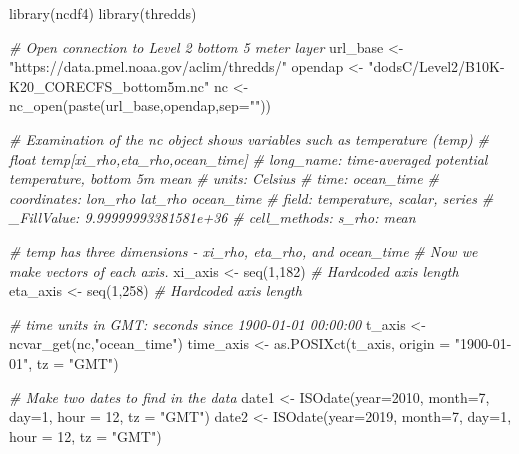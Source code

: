 \documentclass[
]{article}
\newenvironment{Shaded}{\begin{snugshade}}{\end{snugshade}}
\newcommand{\AttributeTok}[1]{\textcolor[rgb]{0.77,0.63,0.00}{#1}}
\newcommand{\CommentTok}[1]{\textcolor[rgb]{0.56,0.35,0.01}{\textit{#1}}}
\newcommand{\DecValTok}[1]{\textcolor[rgb]{0.00,0.00,0.81}{#1}}
\newcommand{\FunctionTok}[1]{\textcolor[rgb]{0.00,0.00,0.00}{#1}}
\newcommand{\NormalTok}[1]{#1}
\newcommand{\OtherTok}[1]{\textcolor[rgb]{0.56,0.35,0.01}{#1}}
\newcommand{\StringTok}[1]{\textcolor[rgb]{0.31,0.60,0.02}{#1}}
\begin{document}
\begin{Shaded}
\begin{Highlighting}[]
   \FunctionTok{library}\NormalTok{(ncdf4)}
   \FunctionTok{library}\NormalTok{(thredds)  }

   \CommentTok{\# Open connection to Level 2 bottom 5 meter layer}
\NormalTok{   url\_base }\OtherTok{\textless{}{-}} \StringTok{"https://data.pmel.noaa.gov/aclim/thredds/"}
\NormalTok{   opendap  }\OtherTok{\textless{}{-}} \StringTok{"dodsC/Level2/B10K{-}K20\_CORECFS\_bottom5m.nc"}
\NormalTok{   nc       }\OtherTok{\textless{}{-}} \FunctionTok{nc\_open}\NormalTok{(}\FunctionTok{paste}\NormalTok{(url\_base,opendap,}\AttributeTok{sep=}\StringTok{""}\NormalTok{))}

   \CommentTok{\# Examination of the nc object shows variables such as temperature (temp)}
   \CommentTok{\#        float temp[xi\_rho,eta\_rho,ocean\_time]   }
   \CommentTok{\#            long\_name: time{-}averaged potential temperature, bottom 5m mean}
   \CommentTok{\#            units: Celsius}
   \CommentTok{\#            time: ocean\_time}
   \CommentTok{\#            coordinates: lon\_rho lat\_rho ocean\_time}
   \CommentTok{\#            field: temperature, scalar, series}
   \CommentTok{\#            \_FillValue: 9.99999993381581e+36}
   \CommentTok{\#            cell\_methods: s\_rho: mean}

   \CommentTok{\# temp has three dimensions {-} xi\_rho, eta\_rho, and ocean\_time}
   \CommentTok{\# Now we make vectors of each axis.}
\NormalTok{   xi\_axis  }\OtherTok{\textless{}{-}} \FunctionTok{seq}\NormalTok{(}\DecValTok{1}\NormalTok{,}\DecValTok{182}\NormalTok{) }\CommentTok{\# Hardcoded axis length}
\NormalTok{   eta\_axis }\OtherTok{\textless{}{-}} \FunctionTok{seq}\NormalTok{(}\DecValTok{1}\NormalTok{,}\DecValTok{258}\NormalTok{) }\CommentTok{\# Hardcoded axis length}

   \CommentTok{\# time units in GMT: seconds since 1900{-}01{-}01 00:00:00}
\NormalTok{   t\_axis   }\OtherTok{\textless{}{-}} \FunctionTok{ncvar\_get}\NormalTok{(nc,}\StringTok{"ocean\_time"}\NormalTok{)}
\NormalTok{   time\_axis }\OtherTok{\textless{}{-}} \FunctionTok{as.POSIXct}\NormalTok{(t\_axis, }\AttributeTok{origin =} \StringTok{"1900{-}01{-}01"}\NormalTok{, }\AttributeTok{tz =} \StringTok{"GMT"}\NormalTok{)}

   \CommentTok{\# Make two dates to find in the data}
\NormalTok{   date1 }\OtherTok{\textless{}{-}} \FunctionTok{ISOdate}\NormalTok{(}\AttributeTok{year=}\DecValTok{2010}\NormalTok{, }\AttributeTok{month=}\DecValTok{7}\NormalTok{, }\AttributeTok{day=}\DecValTok{1}\NormalTok{, }\AttributeTok{hour =} \DecValTok{12}\NormalTok{, }\AttributeTok{tz =} \StringTok{"GMT"}\NormalTok{)}
\NormalTok{   date2 }\OtherTok{\textless{}{-}} \FunctionTok{ISOdate}\NormalTok{(}\AttributeTok{year=}\DecValTok{2019}\NormalTok{, }\AttributeTok{month=}\DecValTok{7}\NormalTok{, }\AttributeTok{day=}\DecValTok{1}\NormalTok{, }\AttributeTok{hour =} \DecValTok{12}\NormalTok{, }\AttributeTok{tz =} \StringTok{"GMT"}\NormalTok{)}


\end{Highlighting}
\end{Shaded}
\end{document}
